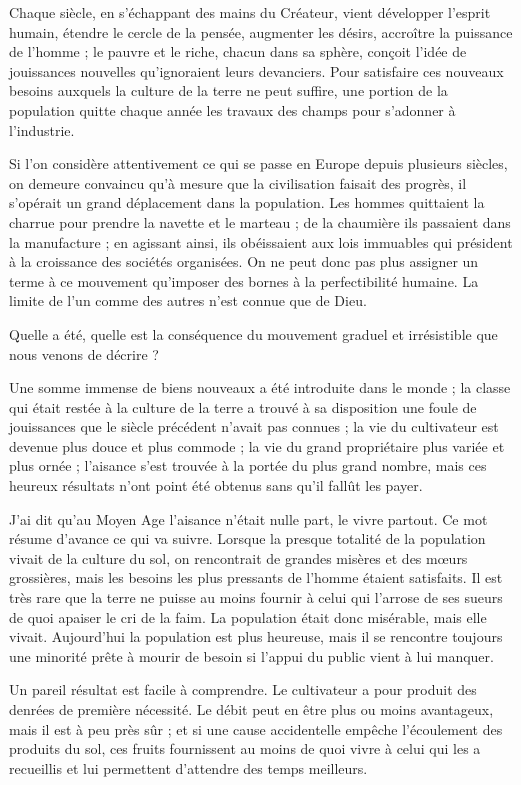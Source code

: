 \documentclass[french,twoside]{book} %
\begin{document}
Chaque siècle, en s’échappant des mains du Créateur, vient développer l’esprit humain, étendre le cercle de la pensée, augmenter les désirs, accroître la puissance de l’homme ; le pauvre et le riche, chacun dans sa sphère, conçoit l’idée de jouissances nouvelles qu’ignoraient leurs devanciers. Pour satisfaire ces nouveaux besoins auxquels la culture de la terre ne peut suffire, une portion de la population quitte chaque année les travaux des champs pour s’adonner à l’industrie.\par
Si l’on considère attentivement ce qui se passe en Europe depuis plusieurs siècles, on demeure convaincu qu’à mesure que la civilisation faisait des progrès, il s’opérait un grand déplacement dans la population. Les hommes quittaient la charrue pour prendre la navette et le marteau ; de la chaumière ils passaient dans la manufacture ; en agissant ainsi, ils obéissaient aux lois immuables qui président à la croissance des sociétés organisées. On ne peut donc pas plus assigner un terme à ce mouvement qu’imposer des bornes à la perfectibilité humaine. La limite de l’un comme des autres n’est connue que de Dieu.\par
Quelle a été, quelle est la conséquence du mouvement graduel et irrésistible que nous venons de décrire ?\par
Une somme immense de biens nouveaux a été introduite dans le monde ; la classe qui était restée à la culture de la terre a trouvé à sa disposition une foule de jouissances que le siècle précédent n’avait pas connues ; la vie du cultivateur est devenue plus douce et plus commode ; la vie du grand propriétaire plus variée et plus ornée ; l’aisance s’est trouvée à la portée du plus grand nombre, mais ces heureux résultats n’ont point été obtenus sans qu’il fallût les payer.\par
J'ai dit qu’au Moyen Age l’aisance n’était nulle part, le vivre partout. Ce mot résume d’avance ce qui va suivre. Lorsque la presque totalité de la population vivait de la culture du sol, on rencontrait de grandes misères et des mœurs grossières, mais les besoins les plus pressants de l’homme étaient satisfaits. Il est très rare que la terre ne puisse au moins fournir à celui qui l’arrose de ses sueurs de quoi apaiser le cri de la faim. La population était donc misérable, mais elle vivait. Aujourd’hui la population est plus heureuse, mais il se rencontre toujours une minorité prête à mourir de besoin si l’appui du public vient à lui manquer.\par
Un pareil résultat est facile à comprendre. Le cultivateur a pour produit des denrées de première nécessité. Le débit peut en être plus ou moins avantageux, mais il est à peu près sûr ; et si une cause accidentelle empêche l’écoulement des produits du sol, ces fruits fournissent au moins de quoi vivre à celui qui les a recueillis et lui permettent d’attendre des temps meilleurs.\par
\end{document}

